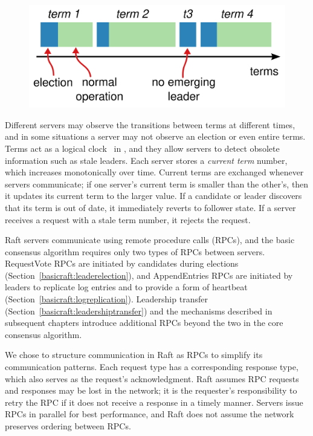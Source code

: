 \begin{figure}
\centering
\includegraphics[scale=.50]{basicraft/terms}
\label{fig:basicraft:terms}
\end{figure}

Different servers may observe the transitions between terms
at different times, and in some situations a server may not observe
an election or even entire terms.
Terms act as a logical clock~\cite{Lamport:1978} in \name{},
and they allow
servers to detect obsolete information such as stale leaders.
Each server stores a \emph{current term} number, which increases
monotonically over time. Current terms are exchanged whenever
servers communicate; if one server's current term is smaller than
the other's, then it updates its current term to the larger value.
If a candidate or leader discovers that its term is out of date,
it immediately reverts to follower state.
If a server receives a request with a stale term number, it
rejects the request.

Raft servers communicate using remote procedure calls (RPCs), and the
basic consensus algorithm requires only two types of RPCs between
servers. RequestVote RPCs are initiated by candidates during elections
(Section~\ref{basicraft:leaderelection}), and AppendEntries RPCs are
initiated by leaders to replicate log entries and to provide a form of
heartbeat (Section~\ref{basicraft:logreplication}). Leadership transfer
(Section~\ref{basicraft:leadershiptransfer}) and the mechanisms
described in subsequent chapters introduce additional RPCs beyond the
two in the core consensus algorithm.

We chose to structure communication in Raft as RPCs to simplify
its communication patterns. Each request type has a corresponding response
type, which also serves as the request's acknowledgment. Raft assumes RPC
requests and responses may be lost in the network; it is the requester's
responsibility to retry the RPC if it does not receive a response in a
timely manner. Servers issue RPCs in parallel for best performance, and
Raft does not assume the network preserves ordering between RPCs.

